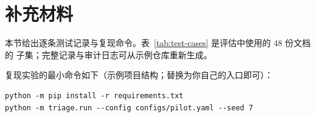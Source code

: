 \section{补充材料}
\label{app:cases}

本节给出逐条测试记录与复现命令。表~\ref{tab:test-cases} 是评估中使用的 48 份文档的
子集；完整记录与审计日志可从示例仓库重新生成。



复现实验的最小命令如下（示例项目结构；替换为你自己的入口即可）：

\begin{verbatim}
python -m pip install -r requirements.txt
python -m triage.run --config configs/pilot.yaml --seed 7
\end{verbatim}
